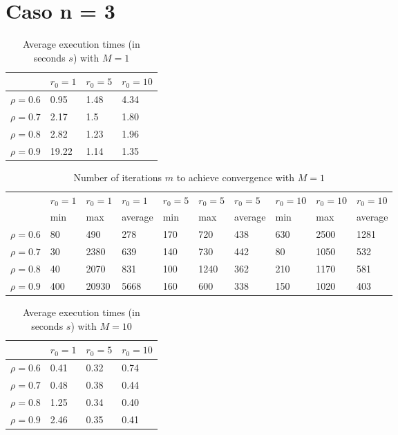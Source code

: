 \documentclass[a4paper,11pt,openright]{report}
\begin{document}
\section*{Caso n = 3}  
\begin{table}[H]
\centering
\addtolength{\leftskip}{-1.5cm}
\addtolength{\rightskip}{-1.5cm}
\begin{tabular}{|c|lll|}
\hline
$ $ & $r_0 = 1$ & $r_0 = 5$ & $r_0 = 10$ \\
\hline
$\rho = 0.6$ & 0.95 & 1.48 & 4.34 \\

$\rho = 0.7$ & 2.17 & 1.5 & 1.80 \\

$\rho = 0.8$ & 2.82 & 1.23 & 1.96 \\

$\rho = 0.9$ & 19.22 & 1.14 & 1.35 \\
\hline
\end{tabular}
\caption{Average execution
 times (in seconds $s$) with $M = 1$}
\end{table}
\begin{table}[H]
\centering
\addtolength{\leftskip}{-1.5cm}
\addtolength{\rightskip}{-1.5cm}
\begin{tabular}{|c|lllllllll|}
\hline
$ $ & $r_0 = 1$ & $r_0 = 1$ & $r_0 = 1$ & $r_0 = 5$ & $r_0 = 5$ & $r_0 = 5$ & $r_0 = 10$ & $r_0 = 10$ & $r_0 = 10$  \\
$ $ & min & max & average & min & max & average & min & max & average \\ 
\hline
$\rho = 0.6$ & 80 & 490 & 278 & 170 & 720 & 438 & 630 & 2500 & 1281 \\

$\rho = 0.7$ & 30 & 2380 & 639 & 140 & 730 & 442 & 80 & 1050 & 532\\

$\rho = 0.8$ & 40 & 2070 & 831 & 100 & 1240 & 362 & 210 & 1170 & 581\\

$\rho = 0.9$ & 400 & 20930 & 5668 & 160 & 600 & 338 & 150 & 1020 & 403\\
\hline
\end{tabular}
\caption{Number of iterations $m$ to achieve convergence with $M = 1$}
\end{table}
\begin{table}[H]
\centering
\addtolength{\leftskip}{-1.5cm}
\addtolength{\rightskip}{-1.5cm}
\begin{tabular}{|c|lll|}
\hline
$ $ & $r_0 = 1$ & $r_0 = 5$ & $r_0 = 10$ \\
\hline
$\rho = 0.6$ & 0.41 & 0.32 & 0.74 \\

$\rho = 0.7$ & 0.48 & 0.38 & 0.44 \\

$\rho = 0.8$ & 1.25 & 0.34 & 0.40 \\

$\rho = 0.9$ & 2.46 & 0.35 & 0.41 \\
\hline
\end{tabular}
\caption{Average execution
 times (in seconds $s$) with $M = 10$}
\end{table}
\end{document}
